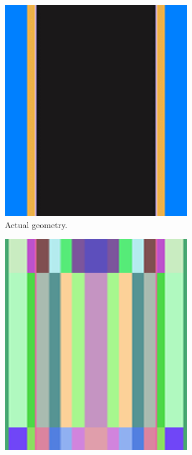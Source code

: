 \begin{figure}
    \centering
    \begin{subfigure}[b]{0.25\textwidth}
        \centering
        \includegraphics[width=\textwidth]{figs/sec_1a.png}
        \caption{Actual geometry.}
        \label{fig_1a}
    \end{subfigure}
    \hspace{6em}
    \begin{subfigure}[b]{0.25\textwidth}
        \centering
        \includegraphics[width=\textwidth]{figs/sec_1b.png}

\end{subfigure}
\end{figure}
